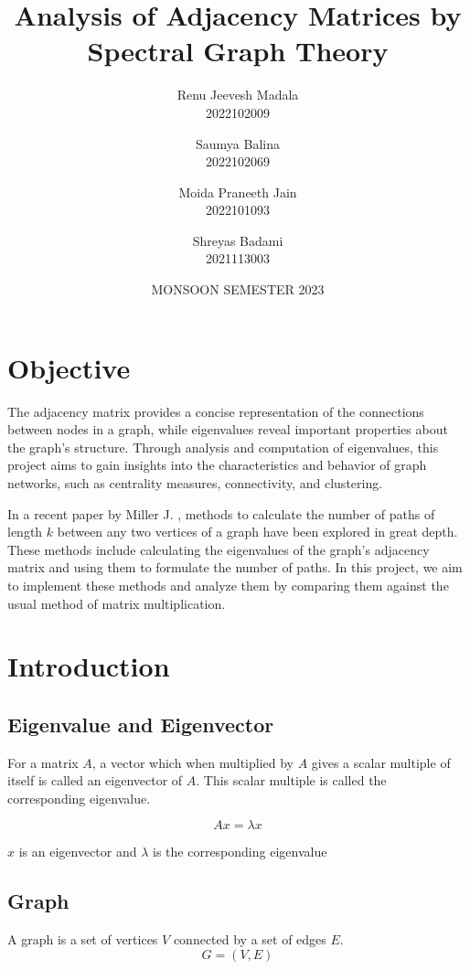 \documentclass[12pt, a4paper]{article}
\title{Analysis of Adjacency Matrices by Spectral Graph Theory}
\author{
  Renu Jeevesh Madala\\
  2022102009
  \and
  Saumya Balina \\
  2022102069
  \and
  Moida Praneeth Jain \\
  2022101093
  \and
  Shreyas Badami \\
  2021113003
}
\date{MONSOON SEMESTER 2023}
\begin{document}
    \begin{titlepage}
      \maketitle
      \thispagestyle{empty}
    \end{titlepage}

    \section{Objective}
    \begin{flushleft}
    The adjacency matrix provides a concise representation of the connections between nodes in a graph, while eigenvalues reveal important properties about
    the graph’s structure. Through analysis and computation of eigenvalues, this
    project aims to gain insights into the characteristics and behavior of graph networks, such as centrality measures, connectivity, and clustering.

      In a recent paper by Miller J. \cite{Jason}, methods to calculate the number of paths of length $k$ between any two vertices of a graph have been explored in great depth. These methods include calculating the eigenvalues of the graph's adjacency matrix and using them to formulate the number of paths. In this project, we aim to implement these methods and analyze them by comparing them against the usual method of matrix multiplication.

    \end{flushleft}
    \section{Introduction}

      \subsection{Eigenvalue and Eigenvector}
      \begin{flushleft}
      For a matrix $A$, a vector which when multiplied by $A$ gives a scalar multiple of itself is called an eigenvector of $A$. This scalar multiple is called the corresponding eigenvalue.

      $$Ax = \lambda x$$

      $x$ is an eigenvector and $\lambda$ is the corresponding eigenvalue

      \end{flushleft}
      \subsection{Graph}
      A graph is a set of vertices $V$ connected by a set of edges $E$.  
      $$G = (V, E)$$
\end{document}
